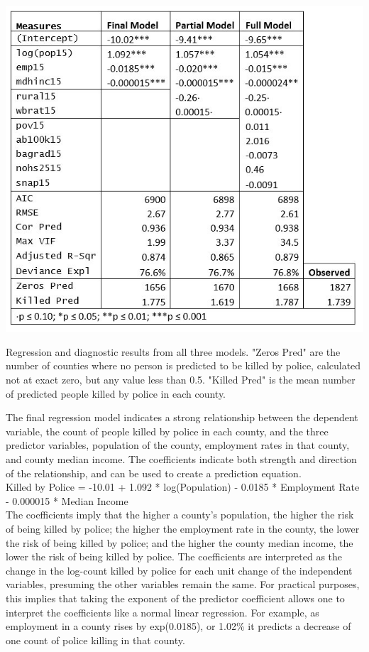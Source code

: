 \documentclass[sigconf]{acmart}
\begin{document}
\begin{table}
\includegraphics[width=1.0\textwidth]{images/table2.jpg}
\caption{Regression and diagnostic results from all three models.  "Zeros Pred" are the number of counties where no person is predicted to be killed by police, calculated not at exact zero, but any value less than 0.5.  "Killed Pred" is the mean number of predicted people killed by police in each county.}
\end{table}

The final regression model indicates a strong relationship between the dependent variable, the count of people killed by police in each county, and the three predictor variables, population of the county, employment rates in that county, and county median income.  The coefficients indicate both strength and direction of the relationship, and can be used to create a prediction equation. \\ 

Killed by Police = -10.01 + 1.092 * log(Population) - 0.0185 * Employment Rate - 0.000015 * Median Income\\

The coefficients imply that the higher a county's population, the higher the risk of being killed by police; the higher the employment rate in the county, the lower the risk of being killed by police; and the higher the county median income, the lower the risk of being killed by police.  The coefficients are interpreted as the change in the log-count killed by police for each unit change of the independent variables, presuming the other variables remain the same.  For practical purposes, this implies that taking the exponent of the predictor coefficient allows one to interpret the coefficients like a normal linear regression.  For example, as employment in a county rises by exp(0.0185), or 1.02\% it predicts a decrease of one count of police killing in that county.
\end{document}
